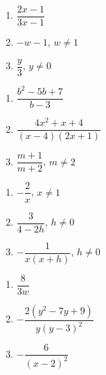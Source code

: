 \documentclass[11pt]{article}
\theoremstyle{definition}  %
\newcounter{HW}
\begin{document}
\begin{multicols}{3}
\begin{enumerate}
\setcounter{enumi}{\value{HW}}

\item  $\dfrac{2x-1}{3x-1}$
\item  $-w-1$, $w \neq 1$
\item  $\dfrac{y}{3}$, $y \neq 0$
 

\setcounter{HW}{\value{enumi}}
\end{enumerate}
\end{multicols}

\begin{multicols}{3}
\begin{enumerate}
\setcounter{enumi}{\value{HW}}

\item  $\dfrac{b^2-5b+7}{b-3}$
\item  $\dfrac{4x^2+x+4}{(x-4)(2x+1)}$
\item  $\dfrac{m+1}{m+2}$, $m \neq 2$

\setcounter{HW}{\value{enumi}}
\end{enumerate}
\end{multicols}

\begin{multicols}{3}
\begin{enumerate}
\setcounter{enumi}{\value{HW}}

\item $-\dfrac{2}{x}$, $x \neq 1$
\item $\dfrac{3}{4-2h}$, $h \neq 0$
\item $-\dfrac{1}{x(x+h)}$, $h \neq 0$

\setcounter{HW}{\value{enumi}}
\end{enumerate}
\end{multicols}


\begin{multicols}{3}
\begin{enumerate}
\setcounter{enumi}{\value{HW}}

\item  $\dfrac{8}{3w}$
\item  $-\dfrac{2(y^2-7y+9)}{y(y-3)^2}$
\item  $-\dfrac{6}{(x-2)^2}$

 
\setcounter{HW}{\value{enumi}}
\end{enumerate}
\end{multicols}
\end{document}
